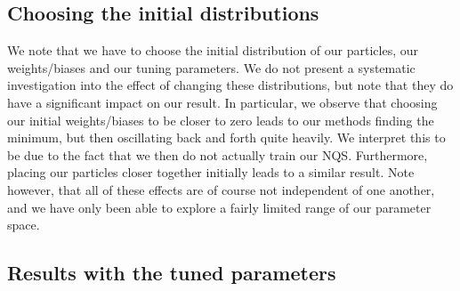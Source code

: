 \documentclass[a4paper, 10pt]{article}
\begin{document}
\subsection{Choosing the initial distributions}
We note that we have to choose the initial distribution of our particles, our weights/biases and our tuning parameters. We do not present a systematic investigation into the effect of changing these distributions, but note that they do have a significant impact on our result. In particular, we observe that choosing our initial weights/biases to be closer to zero leads to our methods finding the minimum, but then oscillating back and forth quite heavily. We interpret this to be due to the fact that we then do not actually train our NQS. Furthermore, placing our particles closer together initially leads to a similar result. Note however, that all of these effects are of course not independent of one another, and we have only been able to explore a fairly limited range of our parameter space. 
\subsection{Results with the tuned parameters}
\end{document}
